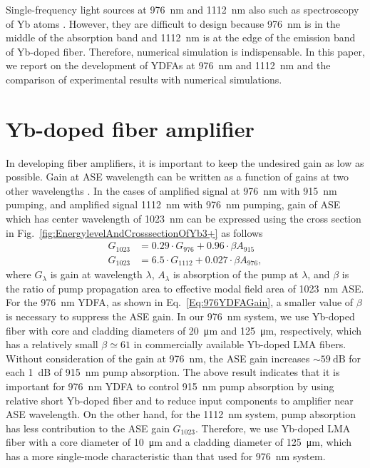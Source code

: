 \documentclass{osa-article}
\begin{document}
Single-frequency light sources at \SI{976}{nm} and \SI{1112}{nm} also such as spectroscopy of Yb atoms  \cite{franzen2018singlestage}.
However, they are difficult to design because \SI{976}{nm} is in the middle of the absorption band and \SI{1112}{nm} is at the edge of the emission band of Yb-doped fiber.
Therefore, numerical simulation is indispensable.
In this paper, we report on the development of YDFAs at \SI{976}{nm} and \SI{1112}{nm} and the comparison of experimental results with numerical simulations.

\section{Yb-doped fiber amplifier}
In developing fiber amplifiers, it is important to keep the undesired gain as low as possible.
Gain at ASE wavelength can be written as a function of gains at two other wavelengths \cite{nilsson1998ringdoped}.
In the cases of amplified signal at \SI{976}{nm} with \SI{915}{nm} pumping, and amplified signal \SI{1112}{nm} with \SI{976}{nm} pumping, gain of ASE which has center wavelength of \SI{1023}{nm} can be expressed using the cross section in Fig.~\ref{fig:EnergylevelAndCrosssectionOfYb3+} as follows
\begin{align}
  G_{1023} &= 0.29\cdot G_{976} + 0.96\cdot \beta A_{915} \label{Eq:976YDFAGain}\\
  G_{1023} &= 6.5\cdot G_{1112} + 0.027\cdot \beta A_{976}, \label{Eq:1112YDFAGain}
\end{align}
where $G_{\lambda}$ is gain at wavelength $\lambda$, $A_{\lambda}$ is absorption of the pump at $\lambda$, and $\beta$ is the ratio of pump propagation area to effective modal field area of \SI{1023}{nm} ASE.
For the \SI{976}{nm} YDFA, as shown in Eq.~\eqref{Eq:976YDFAGain}, a smaller value of $\beta$ is necessary to suppress the ASE gain.
In our \SI{976}{nm} system, we use Yb-doped fiber with core and cladding diameters of \SI{20}{\um} and \SI{125}{\um}, respectively, which has a relatively small $\beta \simeq 61$ in commercially available Yb-doped LMA fibers.
Without consideration of the gain at \SI{976}{nm}, the ASE gain increases $\sim \SI{59}{\dB}$ for each \SI{1}{\dB} of \SI{915}{nm} pump absorption.
The above result indicates that it is important for \SI{976}{nm} YDFA to control \SI{915}{nm} pump absorption by using relative short Yb-doped fiber and to reduce input components to amplifier near ASE wavelength.
On the other hand, for the \SI{1112}{nm} system, pump absorption has less contribution to the ASE gain $G_{1023}$.
Therefore, we use Yb-doped LMA fiber with a core diameter of \SI{10}{\um} and a cladding diameter of \SI{125}{\um}, which has a more single-mode characteristic than that used for \SI{976}{nm} system.
\end{document}
